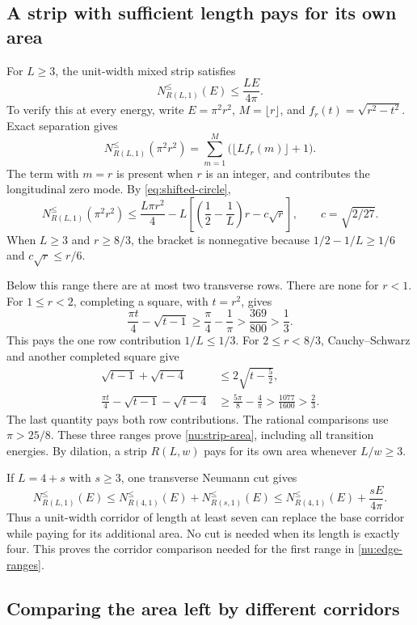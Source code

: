 \documentclass[11pt,reqno]{amsart}
\numberwithin{equation}{section}
\begin{document}
\subsection{A strip with sufficient length pays for its own area}

For $L\ge3$, the unit-width mixed strip satisfies
\begin{equation}
 N_{R(L,1)}^{\le}(E)\le\frac{LE}{4\pi}.
 \label{nu:strip-area}
\end{equation}
To verify this at every energy, write $E=\pi^2r^2$, $M=\lfloor r\rfloor$,
and $f_r(t)=\sqrt{r^2-t^2}$. Exact separation gives
\[
 N_{R(L,1)}^{\le}(\pi^2r^2)
 =\sum_{m=1}^{M}\bigl(\lfloor Lf_r(m)\rfloor+1\bigr).
\]
The term with $m=r$ is present when $r$ is an integer, and contributes
the longitudinal zero mode. By \eqref{eq:shifted-circle},
\[
 N_{R(L,1)}^{\le}(\pi^2r^2)
 \le\frac{L\pi r^2}{4}
 -L\left[\left(\frac12-\frac1L\right)r-c\sqrt r\right],
 \qquad c=\sqrt{2/27}.
\]
When $L\ge3$ and $r\ge8/3$, the bracket is nonnegative because
$1/2-1/L\ge1/6$ and $c\sqrt r\le r/6$.

Below this range there are at most two transverse rows. There are none
for $r<1$. For $1\le r<2$, completing a square, with $t=r^2$, gives
\[
 \frac{\pi t}{4}-\sqrt{t-1}
 \ge\frac\pi4-\frac1\pi
 >\frac{369}{800}>\frac13.
\]
This pays the one row contribution $1/L\le1/3$. For $2\le r<8/3$,
Cauchy--Schwarz and another completed square give
\[
 \begin{split}
 \sqrt{t-1}+\sqrt{t-4}&\le2\sqrt{t-\tfrac52},\\
 \frac{\pi t}{4}-\sqrt{t-1}-\sqrt{t-4}
 &\ge\frac{5\pi}{8}-\frac4\pi
 >\frac{1077}{1600}>\frac23.
 \end{split}
\]
The last quantity pays both row contributions. The rational comparisons
use $\pi>25/8$. These three ranges prove \eqref{nu:strip-area}, including
all transition energies. By dilation, a strip $R(L,w)$ pays for its own
area whenever $L/w\ge3$.

If $L=4+s$ with $s\ge3$, one transverse Neumann cut gives
\[
 N_{R(L,1)}^{\le}(E)
 \le N_{R(4,1)}^{\le}(E)+N_{R(s,1)}^{\le}(E)
 \le N_{R(4,1)}^{\le}(E)+\frac{sE}{4\pi}.
\]
Thus a unit-width corridor of length at least seven can replace the
base corridor while paying for its additional area. No cut is needed
when its length is exactly four. This proves the corridor comparison
needed for the first range in \eqref{nu:edge-ranges}.

\subsection{Comparing the area left by different corridors}
\end{document}
